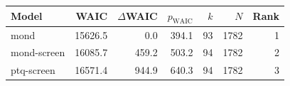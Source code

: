 \begin{tabular}{lrrrrrr}
\toprule
Model & WAIC & $\Delta$WAIC & $p_{\mathrm{WAIC}}$ & $k$ & $N$ & Rank \\
\midrule
mond & 15626.5 & 0.0 & 394.1 & 93 & 1782 & 1 \\
mond-screen & 16085.7 & 459.2 & 503.2 & 94 & 1782 & 2 \\
ptq-screen & 16571.4 & 944.9 & 640.3 & 94 & 1782 & 3 \\
\bottomrule
\end{tabular}
